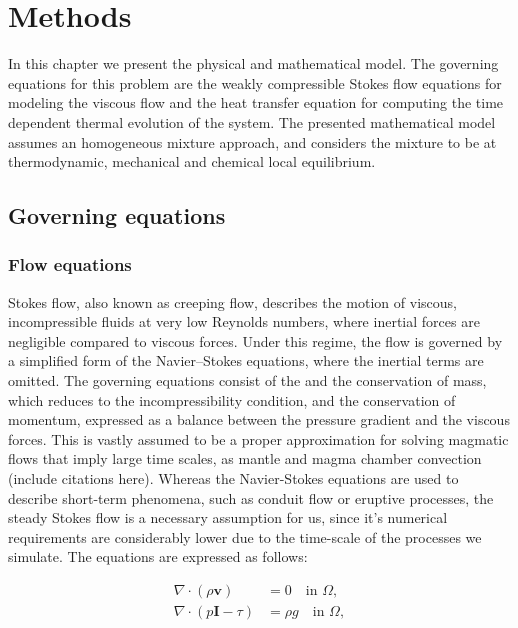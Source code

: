 

\chapter{Methods}
In this chapter we present the physical and mathematical model. The governing equations for this problem are the weakly compressible Stokes flow equations for modeling the viscous flow and the heat transfer equation for computing the time dependent thermal evolution of the system. The presented mathematical model assumes an homogeneous mixture approach, and considers the mixture to be at thermodynamic, mechanical and chemical local equilibrium.  %


\section{Governing equations}
\subsection{Flow equations}
Stokes flow, also known as creeping flow, describes the motion of viscous, incompressible fluids at very low Reynolds numbers, where inertial forces are negligible compared to viscous forces. Under this regime, the flow is governed by a simplified form of the Navier–Stokes equations, where the inertial terms are omitted. The governing equations consist of the and the conservation of mass, which reduces to the incompressibility condition, and the conservation of momentum, expressed as a balance between the pressure gradient and the viscous forces.
This is vastly assumed to be a proper approximation for solving magmatic flows that imply large time scales, as mantle and magma chamber convection (include citations here). Whereas the Navier-Stokes equations are used to describe short-term phenomena, such as conduit flow or eruptive processes, the steady Stokes flow is a necessary assumption for us, since it's numerical requirements are considerably lower due to the time-scale of the processes we simulate. The equations are expressed as follows:

\begin{align}
	\nabla \cdot (\rho \mathbf{v}) &= 0 \quad \text{in } \Omega, \\
	\nabla \cdot (p\boldsymbol{I} - \tau) &= \rho g\quad \text{in } \Omega,
\end{align}

